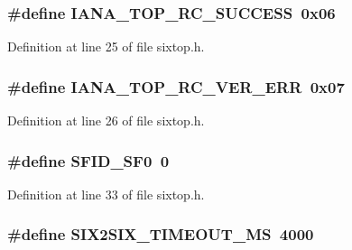 \subsubsection[{\texorpdfstring{I\+A\+N\+A\+\_\+6\+T\+O\+P\+\_\+\+R\+C\+\_\+\+S\+U\+C\+C\+E\+SS}{IANA_6TOP_RC_SUCCESS}}]{\setlength{\rightskip}{0pt plus 5cm}\#define I\+A\+N\+A\+\_\+T\+O\+P\+\_\+\+R\+C\+\_\+\+S\+U\+C\+C\+E\+SS~0x06}\hypertarget{group__sixtop_gaf34161cd672d7fe6175ea1343b31c2bf}{}\label{group__sixtop_gaf34161cd672d7fe6175ea1343b31c2bf}


Definition at line 25 of file sixtop.\+h.

\subsubsection[{\texorpdfstring{I\+A\+N\+A\+\_\+6\+T\+O\+P\+\_\+\+R\+C\+\_\+\+V\+E\+R\+\_\+\+E\+RR}{IANA_6TOP_RC_VER_ERR}}]{\setlength{\rightskip}{0pt plus 5cm}\#define I\+A\+N\+A\+\_\+T\+O\+P\+\_\+\+R\+C\+\_\+\+V\+E\+R\+\_\+\+E\+RR~0x07}\hypertarget{group__sixtop_ga92a8bc12446d9440ef6bd92f0bf63b10}{}\label{group__sixtop_ga92a8bc12446d9440ef6bd92f0bf63b10}


Definition at line 26 of file sixtop.\+h.

\subsubsection[{\texorpdfstring{S\+F\+I\+D\+\_\+\+S\+F0}{SFID_SF0}}]{\setlength{\rightskip}{0pt plus 5cm}\#define S\+F\+I\+D\+\_\+\+S\+F0~0}\hypertarget{group__sixtop_ga14969413ec66e507bee020d526feb199}{}\label{group__sixtop_ga14969413ec66e507bee020d526feb199}


Definition at line 33 of file sixtop.\+h.

\subsubsection[{\texorpdfstring{S\+I\+X2\+S\+I\+X\+\_\+\+T\+I\+M\+E\+O\+U\+T\+\_\+\+MS}{SIX2SIX_TIMEOUT_MS}}]{\setlength{\rightskip}{0pt plus 5cm}\#define S\+I\+X2\+S\+I\+X\+\_\+\+T\+I\+M\+E\+O\+U\+T\+\_\+\+MS~4000}\hypertarget{group__sixtop_gafe4b5903cd4d2dd815d7e22c58b9a2e0}{}\label{group__sixtop_gafe4b5903cd4d2dd815d7e22c58b9a2e0}


